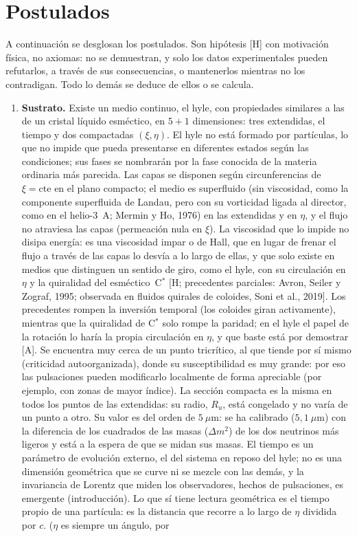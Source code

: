 \documentclass[11pt,a4paper]{article}
\newcommand{\st}[1]{\textup{[#1]}}
\newcommand{\Cst}{C\ensuremath{^{*}}}
\begin{document}
\section{Postulados}\label{sec:postulados}

A continuación se desglosan los postulados. Son hipótesis \st{H} con motivación física, no axiomas: no se demuestran, y solo los datos experimentales pueden refutarlos, a través de sus consecuencias, o mantenerlos mientras no los contradigan. Todo lo demás se deduce de ellos o se calcula.

\begin{enumerate}[label=\arabic*.,leftmargin=*]

\item \textbf{Sustrato.} Existe un medio continuo, el hyle, con propiedades similares a las de un cristal líquido esméctico, en $5+1$ dimensiones: tres extendidas, el tiempo y dos compactadas $(\xi,\eta)$. El hyle no está formado por partículas, lo que no impide que pueda presentarse en diferentes estados según las condiciones; sus fases se nombrarán por la fase conocida de la materia ordinaria más parecida. Las capas se disponen según circunferencias de $\xi=\text{cte}$ en el plano compacto; el medio es superfluido (sin viscosidad, como la componente superfluida de Landau, pero con su vorticidad ligada al director, como en el helio-3~A; Mermin y Ho, 1976) en las extendidas y en $\eta$, y el flujo no atraviesa las capas (permeación nula en $\xi$). La viscosidad que lo impide no disipa energía: es una viscosidad impar o de Hall, que en lugar de frenar el flujo a través de las capas lo desvía a lo largo de ellas, y que solo existe en medios que distinguen un sentido de giro, como el hyle, con su circulación en $\eta$ y la quiralidad del esméctico~\Cst{} \st{H; precedentes parciales: Avron, Seiler y Zograf, 1995; observada en fluidos quirales de coloides, Soni et al., 2019}. Los precedentes rompen la inversión temporal (los coloides giran activamente), mientras que la quiralidad de \Cst{} solo rompe la paridad; en el hyle el papel de la rotación lo haría la propia circulación en $\eta$, y que baste está por demostrar \st{A}. Se encuentra muy cerca de un punto tricrítico, al que tiende por sí mismo (criticidad autoorganizada), donde su susceptibilidad es muy grande: por eso las pulsaciones pueden modificarlo localmente de forma apreciable (por ejemplo, con zonas de mayor índice). La sección compacta es la misma en todos los puntos de las extendidas: su radio, $R_u$, está congelado y no varía de un punto a otro. Su valor es del orden de $5~\mu$m: se ha calibrado ($5,1~\mu$m) con la diferencia de los cuadrados de las masas ($\Delta m^2$) de los dos neutrinos más ligeros y está a la espera de que se midan sus masas. El tiempo es un parámetro de evolución externo, el del sistema en reposo del hyle; no es una dimensión geométrica que se curve ni se mezcle con las demás, y la invariancia de Lorentz que miden los observadores, hechos de pulsaciones, es emergente (introducción). Lo que sí tiene lectura geométrica es el tiempo propio de una partícula: es la distancia que recorre a lo largo de $\eta$ dividida por $c$. ($\eta$ es siempre un ángulo, por 
\end{enumerate}
\end{document}

